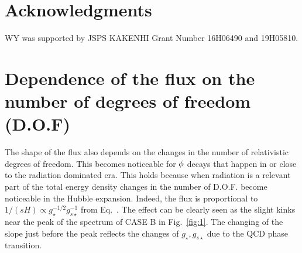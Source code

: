 \documentclass[superscriptaddress,aps,preprintnumbers,amsmath,showpacs,amssymb,prd,nofootinbib,reprint]{revtex4-1}
\begin{document}
{%
\section*{Acknowledgments}
WY was supported by JSPS KAKENHI Grant Number 16H06490 and 19H05810. 


\appendix

\section{Dependence of the flux on the number of degrees of freedom (D.O.F) }
\label{Appendix:A}

The shape of the flux also depends on the changes in the number of relativistic degrees of freedom. This becomes noticeable for $\phi$ decays that happen in or close to the radiation dominated era. This holds because when radiation is a relevant part of the total energy density
changes in the number of D.O.F. become noticeable in the Hubble expansion. 
Indeed, the flux is proportional to $1/(s H)\propto g_\star^{-1/2}g_{s \star}^{-1}$ from Eq.~. 
The effect can be clearly seen as the slight kinks near the peak of the spectrum of CASE B in Fig.~\ref{fig:1}. The changing of the slope just before the peak reflects the changes of $g_\star,g_{s\star}$ due to the QCD phase transition. 


}
\end{document}
